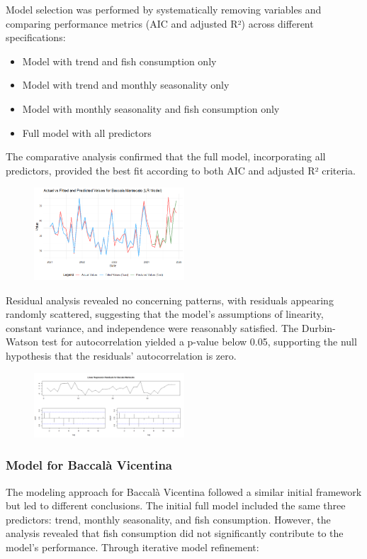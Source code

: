 \documentclass[10pt,twocolumn,letterpaper]{article}
\begin{document}
Model selection was performed by systematically removing variables and comparing performance metrics (AIC and adjusted R²) across different specifications:
\begin{itemize}[noitemsep, topsep=0pt]
    \item Model with trend and fish consumption only
    \item Model with trend and monthly seasonality only
    \item Model with monthly seasonality and fish consumption only
    \item Full model with all predictors
\end{itemize}
The comparative analysis confirmed that the full model, incorporating all predictors, provided the best fit according to both AIC and adjusted R² criteria.
\begin{figure}[H]
    \centering
    \includegraphics[width=0.5\textwidth]{PlotsBEFD/PRED_LR_MAN.png} 
    \caption{}
    \label{fig:esempio}
\end{figure}
Residual analysis revealed no concerning patterns, with residuals appearing randomly scattered, suggesting that the model's assumptions of linearity, constant variance, and independence were reasonably satisfied. The Durbin-Watson test for autocorrelation yielded a p-value below 0.05, supporting the null hypothesis that the residuals' autocorrelation is zero.
\begin{figure}[H]
    \centering
    \includegraphics[width=0.5\textwidth]{PlotsBEFD/RES_LR_MAN.png} 
    \caption{}
    \label{fig:esempio}
\end{figure}

\subsubsection{Model for Baccalà Vicentina}
The modeling approach for Baccalà Vicentina followed a similar initial framework but led to different conclusions. The initial full model included the same three predictors: trend, monthly seasonality, and fish consumption. However, the analysis revealed that fish consumption did not significantly contribute to the model's performance.
Through iterative model refinement:
\end{document}
